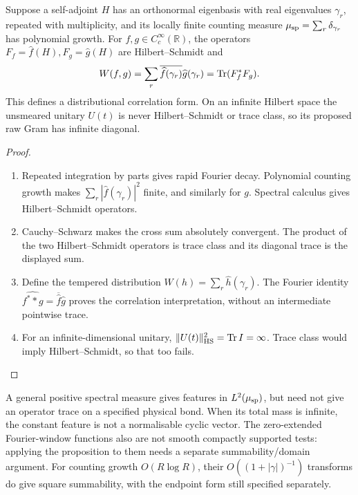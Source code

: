 \begin{proposition}
\label{prop:ccm-tn-infinite-smeared-gram}
Suppose a self-adjoint $H$ has an orthonormal eigenbasis with real
eigenvalues $\gamma_r$, repeated with multiplicity, and its locally
finite counting measure $\mu_{\mathrm{sp}}=\sum_r\delta_{\gamma_r}$ has polynomial
growth. For $f,g\in C_c^\infty(\mathbb R)$, the operators
$F_f=\widehat f(H),F_g=\widehat g(H)$ are Hilbert--Schmidt and
\[
 W(f,g)=\sum_r\overline{\widehat f(\gamma_r)}\widehat g(\gamma_r)
       =\operatorname{Tr}(F_f^*F_g).
\]
This defines a distributional correlation form. On an infinite
Hilbert space the unsmeared unitary $U(t)$ is never Hilbert--Schmidt
or trace class, so its proposed raw Gram has infinite diagonal.
\end{proposition}
\begin{proof}
\begin{enumerate}
\item[$\langle1\rangle$1.] Repeated integration by parts gives rapid
Fourier decay. Polynomial counting growth makes
$\sum_r|\widehat f(\gamma_r)|^2$ finite, and similarly for $g$.
Spectral calculus gives Hilbert--Schmidt operators.
\item[$\langle1\rangle$2.] Cauchy--Schwarz makes the cross sum
absolutely convergent. The product of the two Hilbert--Schmidt
operators is trace class and its diagonal trace is the displayed sum.
\item[$\langle1\rangle$3.] Define the tempered distribution
$W(h)=\sum_r\widehat h(\gamma_r)$.
The Fourier identity
$\widehat{f^**g}=\overline{\widehat f}\widehat g$ proves the
correlation interpretation, without an intermediate pointwise trace.
\item[$\langle1\rangle$4.] For an infinite-dimensional unitary,
$\|U(t)\|_{\mathrm{HS}}^2=\operatorname{Tr} I=\infty$. Trace class would imply
Hilbert--Schmidt, so that too fails.
\end{enumerate}
\end{proof}

A general positive spectral measure gives features in $L^2(\mu_{\mathrm{sp}})$,
but need not give an operator trace on a specified physical bond.
When its total mass is infinite, the constant feature is not a
normalisable cyclic vector. The zero-extended Fourier-window functions
also are not smooth compactly supported tests: applying the proposition
to them needs a separate summability/domain argument. For counting
growth $O(R\log R)$, their $O((1+|\gamma|)^{-1})$ transforms do give
square summability, with the endpoint form still specified separately.

